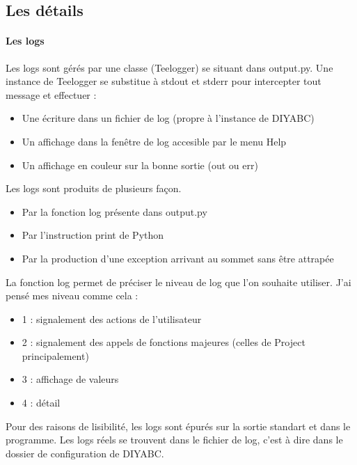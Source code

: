 \documentclass[12pt,a4paper]{article}
\begin{document}
    \subsection{Les détails}
        \paragraph{Les logs}
        Les logs sont gérés par une classe (Teelogger) se situant dans output.py. Une instance de Teelogger
        se substitue à stdout et stderr pour intercepter tout message et effectuer : 
        \begin{itemize}
            \item Une écriture dans un fichier de log (propre à l'instance de DIYABC)
            \item Un affichage dans la fenêtre de log accesible par le menu Help
            \item Un affichage en couleur sur la bonne sortie (out ou err) \\
        \end{itemize}

        Les logs sont produits de plusieurs façon. 
        \begin{itemize}
            \item Par la fonction log présente dans output.py
            \item Par l'instruction print de Python
            \item Par la production d'une exception arrivant au sommet sans être attrapée\\
        \end{itemize}
        
        La fonction log permet de préciser le niveau de log que l'on souhaite utiliser. J'ai pensé mes niveau comme cela :
        \begin{itemize}
            \item 1 : signalement des actions de l'utilisateur
            \item 2 : signalement des appels de fonctions majeures (celles de Project principalement)
            \item 3 : affichage de valeurs
            \item 4 : détail
        \end{itemize}

        Pour des raisons de lisibilité, les logs sont épurés sur la sortie standart et dans le programme. Les logs réels
        se trouvent dans le fichier de log, c'est à dire dans le dossier de configuration de DIYABC.
\end{document}
